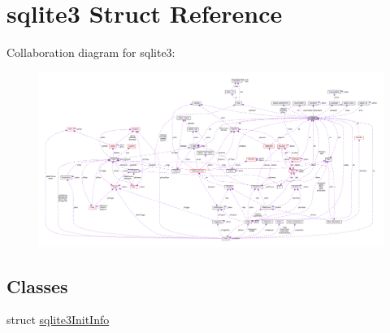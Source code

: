 \hypertarget{structsqlite3}{}\section{sqlite3 Struct Reference}
\label{structsqlite3}


Collaboration diagram for sqlite3\+:\nopagebreak
\begin{figure}[H]
\begin{center}
\leavevmode
\includegraphics[width=350pt]{structsqlite3__coll__graph}
\end{center}
\end{figure}
\subsection*{Classes}
\begin{DoxyCompactItemize}
\item 
struct \hyperlink{structsqlite3_1_1sqlite3InitInfo}{sqlite3\+Init\+Info}
\end{DoxyCompactItemize}
